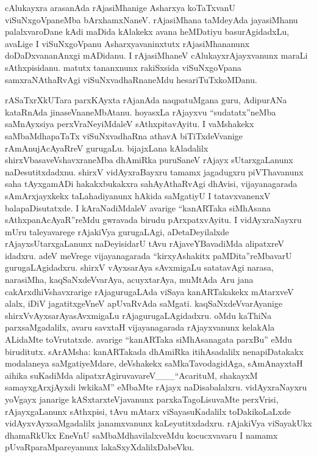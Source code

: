 \documentclass[11pt,a4size]{article}
\begin{document}
cAlukayxra arasanAda rAjasiMhanige Asharxya koTaTxvanU
viSuNxgoVpaneMba bArxhamxNaneV. rAjasiMhana taMdeyAda jayasiMhanu
palalxvaroDane kAdi maDida kAlakekx avana heMDatiyu basurAgidadxLu,
avaLige I viSuNxgoVpanu Asharxyavaninxtutx rAjasiMhananunx
doDaDxvananAnxgi mADidanu. I rAjasiMhaneV cAlukayxrAjayxvanunx maraLi
sAthxpisidanu. matutx tananxnunx rakiSxsida viSuNxgoVpana
samxraNAthaRvAgi viSuNxvadhaRnaneMdu hesariTuTxkoMDanu.

rASaTxrXkUTara parxKAyxta rAjanAda naqpatuMgana guru, AdipurANa
kataRnAda jinaseVnaneMbAtanu. hoyasxLa rAjayxvu ``sudatatx''neMba
saMnAyxsiya perxVraNeyiMdaleV sAthxpitavAyitu. I vaMshakekx
saMbaMdhapaTaTx viSuNxvadhaRna athavA biTiTxdeVvanige rAmAnujAcAyaRreV
gurugaLu. bijajxLana kAladalilx shirxVbasaveVshavxraneMba
 dhAmiRka
puruSaneV rAjayx sUtarxgaLanunx naDesutitxdadxnu. shirxV
vidAyxraBayxru
 tamamx jagadugxru piVThavanunx saha tAyxgamADi
hakakxbukakxra sahAyAthaRvAgi dhAvisi, vijayanagarada sAmArxjayxkekx
taLahadiyanunx hAkida saMgatiyU I tatavxvanenxV balapaDisutatxde. I
kAraNadiMdaleV avarige ``kanARTaka siMhAsana sAthxpanAcAyaR''reMdu
gwravada birudu pArxpatxvAyitu. I vidAyxraNayxru
 mUru taleyavarege
rAjakiVya gurugaLAgi, aDetaDeyilalxde rAjayxsUtarxgaLanunx
naDeyisidarU tAvu rAjaveYBavadiMda alipatxreV idadxru. adeV meVrege
vijayanagarada ``kirxyAshakitx paMDita''reMbavarU
gurugaLAgidadxru. shirxV vAyxsarAya
 sAvxmigaLu satatavAgi narasa,
narasiMha, kaqSaNxdeVvarAya, acuyxtarAya, muMtAda Aru jana
cakArxdhiVshavxrarige rAjagurugaLAda viSaya kanARTakakekx mAtarxveV
alalx, iDiV jagatitxgeVneV apUvaRvAda saMgati. kaqSaNxdeVvarAyanige
shirxVvAyxsarAyasAvxmigaLu
 rAjagurugaLAgidadxru. oMdu kaThiNa
parxsaMgadalilx, avaru savxtaH vijayanagarada rAjayxvanunx kelakAla
ALidaMte toVrutatxde. avarige ``kanARTaka siMhAsanagata parxBu'' eMdu
biruditutx. sArAMsha: kanARTakada dhAmiRka itihAsadalilx
nenapiDatakakx modalaneya saMgatiyeMdare, deVshakekx
saMkaTavodagidAga, sAmAnayxtaH aihika suKadiMda
alipatxrAgiruvavareV\_\_\_``AcarituM, shakayxM samayxgArxjAyxdi
lwkikaM'' eMbaMte rAjayx naDisabalalxru. vidAyxraNayxru
 yoVgayx
janarige kASxtarxteVjavanunx parxkaTagoLisuvaMte perxVrisi,
rAjayxgaLanunx sAthxpisi, tAvu mAtarx viSayasuKadalilx toDakikoLaLxde
vidAyxvAyxsaMgadalilx janamxvanunx kaLeyutitxdadxru. rAjakiVya
viSayakUkx dhamaRkUkx EneVnU saMbaMdhavilalxveMdu kocucxvavaru I
namamx pUvaRparaMpareyanunx lakaSxyXdalilxDabeVku.
\end{document}
